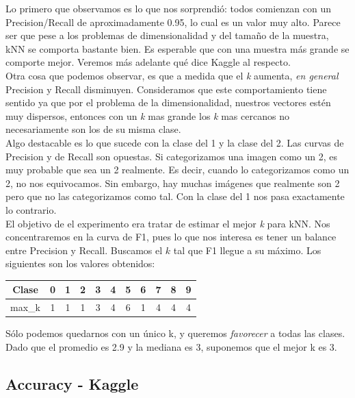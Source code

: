 Lo primero que observamos es lo que nos sorprendió: todos comienzan con un Precision/Recall de aproximadamente 0.95, lo cual es un valor muy alto. Parece ser que pese a los problemas de dimensionalidad y del tamaño de la muestra, kNN se comporta bastante bien. Es esperable que con una muestra más grande se comporte mejor. Veremos más adelante qué dice Kaggle al respecto.\\

Otra cosa que podemos observar, es que a medida que el \textit{k} aumenta, \textit{en general} Precision y Recall disminuyen. Consideramos que este comportamiento tiene sentido ya que por el problema de la dimensionalidad, nuestros vectores estén muy dispersos, entonces con un \textit{k} mas grande los \textit{k} mas cercanos no necesariamente son los de su misma clase. \\

Algo destacable es lo que sucede con la clase del 1 y la clase del 2. Las curvas de Precision y de Recall son opuestas. Si categorizamos una imagen como un 2, es muy probable que sea un 2 realmente. Es decir, cuando lo categorizamos como un 2, no nos equivocamos. Sin embargo, hay muchas imágenes que realmente son 2 pero que no las categorizamos como tal. Con la clase del 1 nos pasa exactamente lo contrario. \\

El objetivo de el experimento era tratar de estimar el mejor \textit{k} para kNN. Nos concentraremos en la curva de F1, pues lo que nos interesa es tener un balance entre Precision y Recall. Buscamos el $k$ tal que F1 llegue a su máximo. Los siguientes son los valores obtenidos: \\

\begin{center}
    \begin{tabular}{| c | c | c | c | c | c | c | c | c | c | c |}
    \hline
    Clase   & 0 & 1 & 2 & 3 & 4 & 5 & 6 & 7 & 8 & 9  \\ \hline
    max_k       & 1 & 1 & 1 & 3 & 4 & 6 & 1 & 4 & 4 & 4  \\ \hline
    \end{tabular}
\end{center}

Sólo podemos quedarnos con un único k, y queremos \textit{favorecer} a todas las clases. Dado que el promedio es 2.9 y la mediana es 3, suponemos que el mejor k es 3.



\newpage
\subsection{Accuracy - Kaggle}

